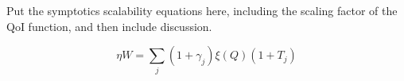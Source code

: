 






Put the symptotics scalability equations here, including the scaling factor of the QoI function, and then include discussion.

\begin{equation}
	\eta W = \sum_{j} ( 1 + \gamma_j) \xi (Q) ( 1 + T_j )
\end{equation}
